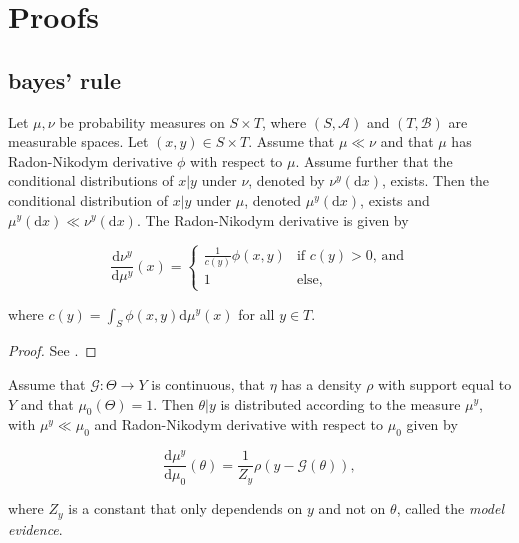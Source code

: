 \section{Proofs}

\subsection{bayes' rule}

\begin{theorem}
  \label{duley}
  Let $\mu, \nu$ be probability measures on $S \times T$, where $(S, \mathcal{A})$ and $(T, \mathcal{B})$ are measurable spaces. Let $(x, y) \in S \times T$. Assume that $\mu \ll \nu$ and that $\mu$ has Radon-Nikodym derivative $\phi$ with respect to $\mu$. Assume further that the conditional distributions of $x|y$ under $\nu$, denoted by $\nu^y(\text{d}x)$, exists. Then the conditional distribution of $x|y$ under $\mu$, denoted $\mu^y(\text{d}x)$, exists and $\mu^y(\text{d}x) \ll \nu^y(\text{d}x)$. The Radon-Nikodym derivative is given by

  \begin{equation}
    \frac{\text{d}\nu^y}{\text{d}\mu^y}(x) =  \begin{cases}
      \frac1{c(y)}\phi(x,y) & \text{if $c(y) > 0$, and}\\
      1 & \text{else,}
    \end{cases}  
  \end{equation}

  where $c(y) = \int_{S}\phi(x,y)\text{d}\mu^y(x)$ for all $y \in T$.
\end{theorem}

\begin{proof}
  See \cite{dudley_2002}.
\end{proof}

\begin{theorem}
  Assume that $\mathcal{G} : \Theta \rightarrow Y$ is continuous, that $\eta$ has a density $\rho$ with support equal to $Y$ and that $\mu_0(\Theta) = 1$. Then $\theta | y$ is distributed according to the measure $\mu^y$, with $\mu^y \ll \mu_0$ and Radon-Nikodym derivative with respect to $\mu_0$ given by

  \begin{equation}
    \frac{\text{d}\mu^y}{\text{d}\mu_0}(\theta) = \frac1{Z_y}\rho(y - \mathcal{G}(\theta)),
  \end{equation}

  where $Z_y$ is a constant that only dependends on $y$ and not on $\theta$, called the \textit{model evidence}.
\end{theorem}

